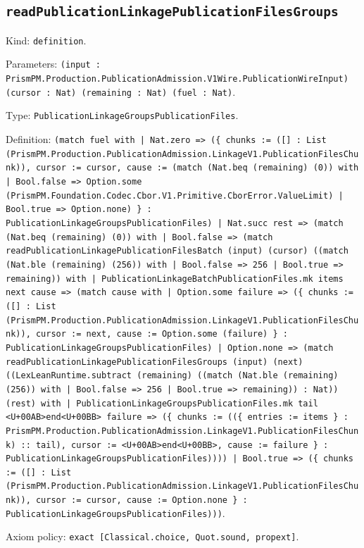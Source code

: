 \documentclass[11pt]{article}
\begin{document}
\subsection*{\texttt{readPublicationLinkagePublicationFilesGroups}}
\noindent Kind: \texttt{definition}.\par
\noindent Parameters: \texttt{(input : PrismPM.Production.PublicationAdmission.V1Wire.PublicationWireInput) (cursor : Nat) (remaining : Nat) (fuel : Nat)}.\par
\noindent Type: \texttt{PublicationLinkageGroupsPublicationFiles}.\par
\noindent Definition: \texttt{(match fuel with | Nat.zero => (\{ chunks := ([] : List (PrismPM.Production.PublicationAdmission.LinkageV1.PublicationFilesChunk)), cursor := cursor, cause := (match (Nat.beq (remaining) (0)) with | Bool.false => Option.some (PrismPM.Foundation.Codec.Cbor.V1.Primitive.CborError.ValueLimit) | Bool.true => Option.none) \} : PublicationLinkageGroupsPublicationFiles) | Nat.succ rest => (match (Nat.beq (remaining) (0)) with | Bool.false => (match readPublicationLinkagePublicationFilesBatch (input) (cursor) ((match (Nat.ble (remaining) (256)) with | Bool.false => 256 | Bool.true => remaining)) with | PublicationLinkageBatchPublicationFiles.mk items next cause => (match cause with | Option.some failure => (\{ chunks := ([] : List (PrismPM.Production.PublicationAdmission.LinkageV1.PublicationFilesChunk)), cursor := next, cause := Option.some (failure) \} : PublicationLinkageGroupsPublicationFiles) | Option.none => (match readPublicationLinkagePublicationFilesGroups (input) (next) ((LexLeanRuntime.subtract (remaining) ((match (Nat.ble (remaining) (256)) with | Bool.false => 256 | Bool.true => remaining)) : Nat)) (rest) with | PublicationLinkageGroupsPublicationFiles.mk tail <U+00AB>end<U+00BB> failure => (\{ chunks := ((\{ entries := items \} : PrismPM.Production.PublicationAdmission.LinkageV1.PublicationFilesChunk) :: tail), cursor := <U+00AB>end<U+00BB>, cause := failure \} : PublicationLinkageGroupsPublicationFiles)))) | Bool.true => (\{ chunks := ([] : List (PrismPM.Production.PublicationAdmission.LinkageV1.PublicationFilesChunk)), cursor := cursor, cause := Option.none \} : PublicationLinkageGroupsPublicationFiles)))}.\par
\noindent Axiom policy: \texttt{exact [Classical.choice, Quot.sound, propext]}.\par
\end{document}
